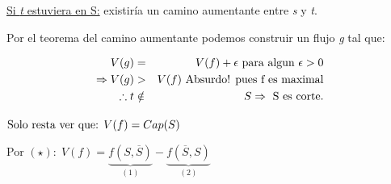 \documentclass[12pt,a4paper]{report}
\begin{document}
  					\vspace{3mm}
  					\underline{Si \textit{t} estuviera en S:} existiría un camino aumentante entre \textit{s} y \textit{t}.
  					\par Por el teorema del camino aumentante podemos construir un flujo \textit{g} tal que:

  					\begin{eqnarray}
  						\nonumber V(g) &=& V(f) + \epsilon \textup{ para algun } \epsilon > 0 \\
  						\nonumber \Rightarrow V(g) &>& V(f) \textup{ Absurdo! pues f es maximal} \\
  						\nonumber \therefore t &\notin & S \Rightarrow \textup{ S es corte.}
  					\end{eqnarray}
  					\par $\textup{Solo resta ver que: } V(f) = Cap(S)$
  					\vspace{3mm}
  					\par Por $(\star): \; V(f) =  \underbrace{f(S, \overline{S})}_{(1)} - \underbrace{f(\overline{S}, S)}_{(2)}$
\end{document}

